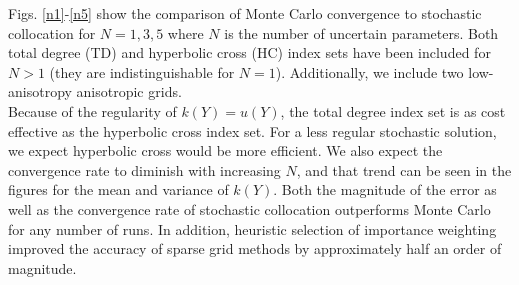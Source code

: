 \documentclass[11pt]{article}
\begin{document}
Figs. \ref{n1}-\ref{n5} show the comparison of Monte Carlo convergence to stochastic collocation for $N=1,3,5$ where $N$ is the number of uncertain parameters.  Both total degree (TD) and hyperbolic cross (HC) index sets have been included for $N>1$ (they are indistinguishable for $N=1$).  Additionally, we include two low-anisotropy anisotropic grids.\\

Because of the regularity of $k(Y)=u(Y)$, the total degree index set is as cost effective as the hyperbolic cross index set.  For a less regular stochastic solution, we expect hyperbolic cross would be more efficient.  We also expect the convergence rate to diminish with increasing $N$, and that trend can be seen in the figures for the mean and variance of $k(Y)$. Both the magnitude of the error as well as the convergence rate of stochastic collocation outperforms Monte Carlo for any number of runs.  In addition, heuristic selection of importance weighting improved the accuracy of sparse grid methods by approximately half an order of magnitude.\\
\end{document}
